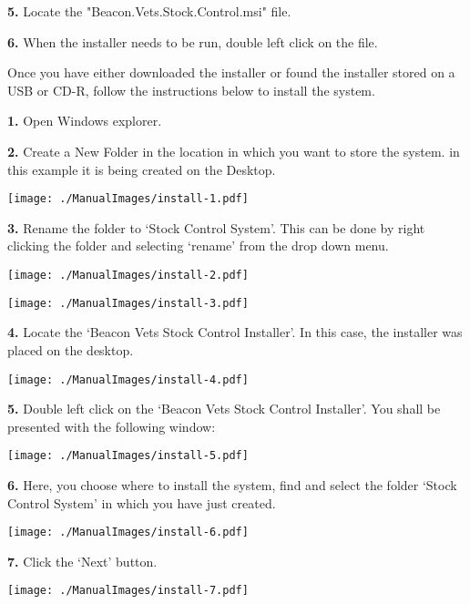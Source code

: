 \vspace{5mm}
\textbf{5.} Locate the "Beacon.Vets.Stock.Control.msi" file.


\vspace{5mm}
\textbf{6.} When the installer needs to be run, double left click on the file.


\vspace{5mm}

Once you have either downloaded the installer or found the installer stored on a USB or CD-R, follow the instructions below to install the system.

\textbf{1.} Open Windows explorer.

\textbf{2.} Create a New Folder in the location in which you want to store the system. in this example it is being created on the Desktop.

\texttt{[image: ./ManualImages/install-1.pdf]}

\pagebreak

\textbf{3.} Rename the folder to `Stock Control System'. This can be done by right clicking the folder and selecting `rename' from the drop down menu.

\texttt{[image: ./ManualImages/install-2.pdf]}

\texttt{[image: ./ManualImages/install-3.pdf]}

\pagebreak

\textbf{4.} Locate the `Beacon Vets Stock Control Installer'. In this case, the installer was placed on the desktop.

\texttt{[image: ./ManualImages/install-4.pdf]}

\pagebreak

\textbf{5.} Double left click on the `Beacon Vets Stock Control Installer'. You shall be presented with the following window:

\texttt{[image: ./ManualImages/install-5.pdf]}

\pagebreak

\textbf{6.} Here, you choose where to install the system, find and select the folder `Stock Control System' in which you have just created.

\texttt{[image: ./ManualImages/install-6.pdf]}

\pagebreak

\textbf{7.} Click the `Next' button.

\texttt{[image: ./ManualImages/install-7.pdf]}

